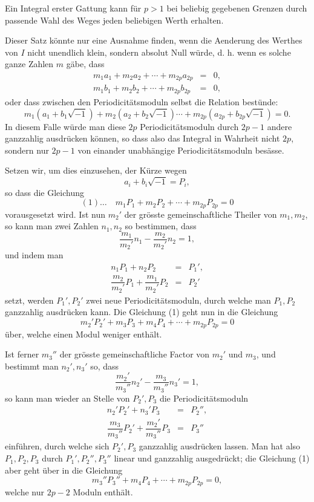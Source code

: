 \documentclass[10pt]{article}
\begin{document}
Ein Integral erster Gattung kann für \(p>1\) bei beliebig gegebenen Grenzen durch passende Wahl des Weges jeden beliebigen Werth erhalten.

Dieser Satz könnte nur eine Ausnahme finden, wenn die Aenderung des Werthes von \(I\) nicht unendlich klein, sondern absolut Null würde, d. h. wenn es solche ganze Zahlen \(m\) gäbe, dass
\[
\begin{array}{rcl}
m_1a_1+m_2a_2+\cdots+m_{2p}a_{2p}&=&0,\\
m_1b_1+m_2b_2+\cdots+m_{2p}b_{2p}&=&0,
\end{array}
\]
oder dass zwischen den Periodicitätsmoduln selbst die Relation bestünde:
\[
m_1(a_1+b_1\sqrt{-1})+m_2(a_2+b_2\sqrt{-1})\cdots+m_{2p}(a_{2p}+b_{2p}\sqrt{-1})=0.
\]
In diesem Falle würde man diese \(2p\) Periodicitätsmoduln durch \(2p-1\) andere ganzzahlig ausdrücken können, so dass also das Integral in Wahrheit nicht \(2p\), sondern nur \(2p-1\) von einander unabhängige Periodicitätsmoduln besässe.

Setzen wir, um dies einzusehen, der Kürze wegen
\[
a_i+b_i\sqrt{-1}=P_i,
\]
so dass die Gleichung
\[
(1)\ldots\quad m_1P_1+m_2P_2+\cdots+m_{2p}P_{2p}=0
\]
vorausgesetzt wird. Ist nun \(m_2'\) der grösste gemeinschaftliche Theiler von \(m_1,m_2\), so kann man zwei Zahlen \(n_1,n_2\) so bestimmen, dass
\[
\frac{m_1}{m_2'}n_1-\frac{m_2}{m_2'}n_2=1,
\]
und indem man
\[
\begin{array}{rcl}
n_1P_1+n_2P_2&=&P_1',\\
\dfrac{m_2}{m_2'}P_1+\dfrac{m_1}{m_2'}P_2&=&P_2'
\end{array}
\]
setzt, werden \(P_1',P_2'\) zwei neue Periodicitätsmoduln, durch welche man \(P_1,P_2\) ganzzahlig ausdrücken kann. Die Gleichung (1) geht nun in die Gleichung
\[
m_2'P_2'+m_3P_3+m_4P_4+\cdots+m_{2p}P_{2p}=0
\]
über, welche einen Modul weniger enthält.

Ist ferner \(m_3''\) der grösste gemeinschaftliche Factor von \(m_2'\) und \(m_3\), und bestimmt man \(n_2',n_3'\) so, dass
\[
\frac{m_2'}{m_3''}n_2'-\frac{m_3}{m_3''}n_3'=1,
\]
so kann man wieder an Stelle von \(P_2',P_3\) die Periodicitätsmoduln
\[
\begin{array}{rcl}
n_2'P_2'+n_3'P_3&=&P_2'',\\
\dfrac{m_3}{m_3''}P_2'+\dfrac{m_2'}{m_3''}P_3&=&P_3''
\end{array}
\]
einführen, durch welche sich \(P_2',P_3\) ganzzahlig ausdrücken lassen. Man hat also \(P_1,P_2,P_3\) durch \(P_1',P_2'',P_3''\) linear und ganzzahlig ausgedrückt; die Gleichung (1) aber geht über in die Gleichung
\[
m_3''P_3''+m_4P_4+\cdots+m_{2p}P_{2p}=0,
\]
welche nur \(2p-2\) Moduln enthält.
\end{document}
